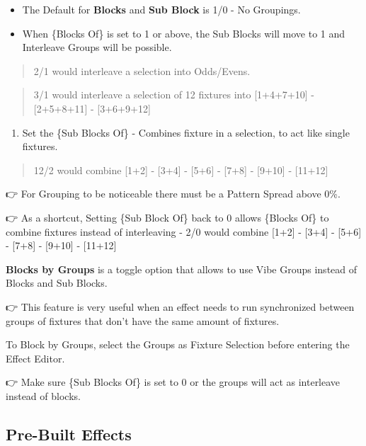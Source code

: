 \documentclass[
]{article}
\providecommand{\tightlist}{%
  \setlength{\itemsep}{0pt}\setlength{\parskip}{0pt}}
\begin{document}
\begin{itemize}
\item
  The Default for \textbf{Blocks} and \textbf{Sub Block} is 1/0 - No Groupings.
\item
  When \{Blocks Of\} is set to 1 or above, the Sub Blocks will move to 1 and Interleave Groups will be possible.
\end{itemize}

\begin{quote}
2/1 would interleave a selection into Odds/Evens.
\end{quote}

\begin{quote}
3/1 would interleave a selection of 12 fixtures into {[}1+4+7+10{]} - {[}2+5+8+11{]} - {[}3+6+9+12{]}
\end{quote}

\begin{enumerate}
\def\labelenumi{\arabic{enumi}.}
\setcounter{enumi}{3}
\tightlist
\item
  Set the \{Sub Blocks Of\} - Combines fixture in a selection, to act like single fixtures.
\end{enumerate}

\begin{quote}
12/2 would combine {[}1+2{]} - {[}3+4{]} - {[}5+6{]} - {[}7+8{]} - {[}9+10{]} - {[}11+12{]}
\end{quote}

👉 For Grouping to be noticeable there must be a Pattern Spread above 0\%.

👉 As a shortcut, Setting \{Sub Block Of\} back to 0 allows \{Blocks Of\} to combine fixtures instead of interleaving - 2/0 would combine {[}1+2{]} - {[}3+4{]} - {[}5+6{]} - {[}7+8{]} - {[}9+10{]} - {[}11+12{]}

\textbf{Blocks by Groups} is a toggle option that allows to use Vibe Groups instead of Blocks and Sub Blocks.

👉 This feature is very useful when an effect needs to run synchronized between groups of fixtures that don't have the same amount of fixtures.

To Block by Groups, select the Groups as Fixture Selection before entering the Effect Editor.

👉 Make sure \{Sub Blocks Of\} is set to 0 or the groups will act as interleave instead of blocks.

\hypertarget{Pre-Built-Effects-9.3}{%
\subsection{Pre-Built Effects}\label{Pre-Built-Effects-9.3}}
\end{document}
